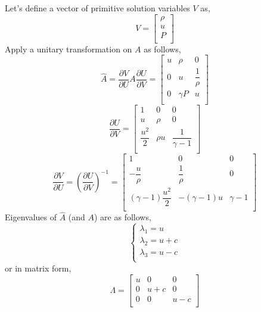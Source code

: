 \documentclass{article}
\begin{document}
Let's define a vector of primitive solution variables $V$ as,
\begin{equation*}
V=
\left[
\begin{matrix}
\rho \\[5pt]
u \\[5pt]
P \\
\end{matrix}
\right]
\end{equation*}
Apply a unitary transformation on $A$ as follows,
\begin{equation*}
\hat{A}=\dfrac{\partial V}{\partial U} A \dfrac{\partial U}{\partial V}=\left[
\begin{matrix}
u & \rho & 0 \\[7pt]
0 & u & \dfrac{1}{\rho} \\[10pt]
0 & \gamma P & u \\
\end{matrix}
\right]
\end{equation*}
\begin{equation*}
\label{eq_UV_1}
\dfrac{\partial U}{\partial V} =
\left[
\begin{matrix}
1 & 0 & 0 \\[10pt]
u & \rho & 0 \\[10pt]
\dfrac{u^2}{2} & \rho u & \dfrac{1}{\gamma-1} \\
\end{matrix}
\right]
\end{equation*}
\begin{equation*}
\label{eq_VU_1}
\dfrac{\partial V}{\partial U} = \left(\dfrac{\partial U}{\partial V} \right)^{-1}=
\left[
\begin{matrix}
1 & 0 & 0 \\[10pt]
-\dfrac{u}{\rho} & \dfrac{1}{\rho} & 0 \\[10pt]
(\gamma-1)\dfrac{u^2}{2} & -(\gamma-1) u & \gamma-1 \\
\end{matrix}
\right]
\end{equation*}
Eigenvalues of $\hat{A}$ (and $A$) are as follows,
\begin{equation*}
\begin{cases}
\lambda_1=u \\
\lambda_2=u+c \\
\lambda_3=u -c\\
\end{cases}
\end{equation*}
or in matrix form,
\begin{equation*}
\Lambda=
\left[
\begin{matrix}
u & 0 &0 \\[5pt]
0 & u+c &0 \\[5pt]
0 & 0 &u-c \\
\end{matrix}
\right]
\end{equation*}
\end{document}
